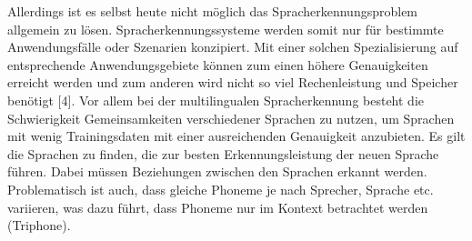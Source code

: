 Allerdings ist es selbst heute nicht möglich das Spracherkennungsproblem allgemein zu lösen. Spracherkennungssysteme werden somit nur für bestimmte Anwendungsfälle oder Szenarien konzipiert. Mit einer solchen Spezialisierung auf entsprechende Anwendungsgebiete können zum einen höhere Genauigkeiten erreicht werden und zum anderen wird nicht so viel Rechenleistung und Speicher benötigt [4]. Vor allem bei der multilingualen Spracherkennung besteht die Schwierigkeit Gemeinsamkeiten verschiedener Sprachen zu nutzen, um Sprachen mit wenig Trainingsdaten mit einer ausreichenden Genauigkeit anzubieten. Es gilt die Sprachen zu finden, die zur besten Erkennungsleistung der neuen Sprache führen. Dabei müssen Beziehungen zwischen den Sprachen erkannt werden. Problematisch ist auch, dass gleiche Phoneme je nach Sprecher, Sprache etc. variieren, was dazu führt, dass Phoneme nur im Kontext betrachtet werden (Triphone). 